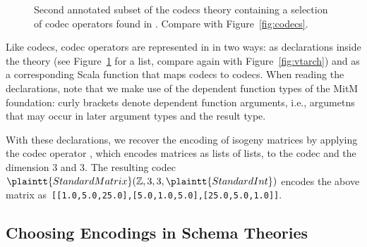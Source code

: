 \begin{figure}[ht]\centering
  \caption[List of Codec Operators]{
    Second annotated subset of the codecs theory containing a selection of codec operators found in \mmt. 
    Compare with Figure~\ref{fig:codecs}. 
  }
  \label{fig:codecops}
\end{figure}
Like codecs, codec operators are represented in \mmt in two ways: as declarations inside the theory  (see Figure~\ref{fig:codecops} for a list, compare again with Figure~\ref{fig:vtarch}) and as a corresponding Scala function that maps codecs to codecs. 
When reading the declarations, note that we make use of the dependent function types of the MitM foundation: curly brackets denote dependent function arguments, i.e., argumetns that may occur in later argument types and the result type.

With these declarations, we recover the \lmfdb encoding of isogeny matrices by applying the codec operator , which encodes matrices as lists of lists, to the codec  and the dimension $3$ and $3$.
The resulting codec $\plaintt{StandardMatrix}(\mathbb{Z}, 3, 3, \plaintt{StandardInt})$ encodes the above matrix as\ \lstinline|[[1.0,5.0,25.0],[5.0,1.0,5.0],[25.0,5.0,1.0]]|.

\subsection{Choosing Encodings in Schema Theories}\label{sec:vt:schema}

